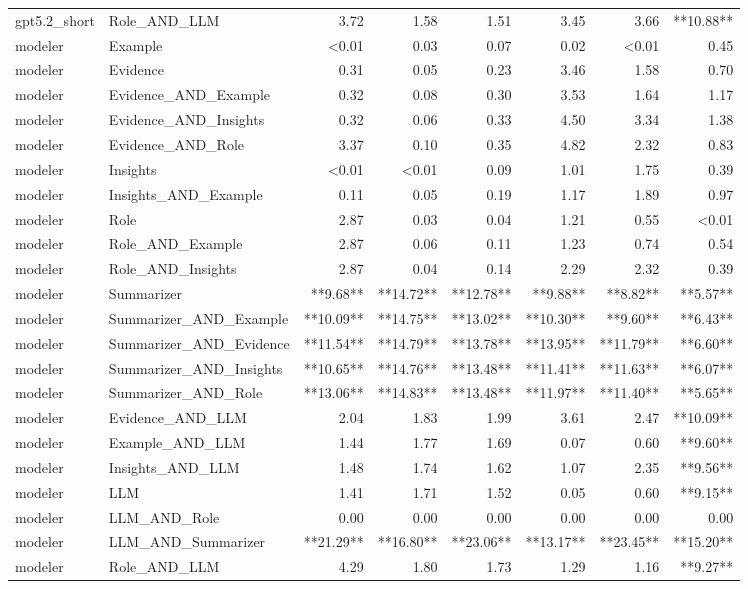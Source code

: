 \begin{tabular}{llrrrrrr}
gpt5.2_short & Role_AND_LLM & 3.72 & 1.58 & 1.51 & 3.45 & 3.66 & **10.88** \\
modeler & Example & <0.01 & 0.03 & 0.07 & 0.02 & <0.01 & 0.45 \\
modeler & Evidence & 0.31 & 0.05 & 0.23 & 3.46 & 1.58 & 0.70 \\
modeler & Evidence_AND_Example & 0.32 & 0.08 & 0.30 & 3.53 & 1.64 & 1.17 \\
modeler & Evidence_AND_Insights & 0.32 & 0.06 & 0.33 & 4.50 & 3.34 & 1.38 \\
modeler & Evidence_AND_Role & 3.37 & 0.10 & 0.35 & 4.82 & 2.32 & 0.83 \\
modeler & Insights & <0.01 & <0.01 & 0.09 & 1.01 & 1.75 & 0.39 \\
modeler & Insights_AND_Example & 0.11 & 0.05 & 0.19 & 1.17 & 1.89 & 0.97 \\
modeler & Role & 2.87 & 0.03 & 0.04 & 1.21 & 0.55 & <0.01 \\
modeler & Role_AND_Example & 2.87 & 0.06 & 0.11 & 1.23 & 0.74 & 0.54 \\
modeler & Role_AND_Insights & 2.87 & 0.04 & 0.14 & 2.29 & 2.32 & 0.39 \\
modeler & Summarizer & **9.68** & **14.72** & **12.78** & **9.88** & **8.82** & **5.57** \\
modeler & Summarizer_AND_Example & **10.09** & **14.75** & **13.02** & **10.30** & **9.60** & **6.43** \\
modeler & Summarizer_AND_Evidence & **11.54** & **14.79** & **13.78** & **13.95** & **11.79** & **6.60** \\
modeler & Summarizer_AND_Insights & **10.65** & **14.76** & **13.48** & **11.41** & **11.63** & **6.07** \\
modeler & Summarizer_AND_Role & **13.06** & **14.83** & **13.48** & **11.97** & **11.40** & **5.65** \\
modeler & Evidence_AND_LLM & 2.04 & 1.83 & 1.99 & 3.61 & 2.47 & **10.09** \\
modeler & Example_AND_LLM & 1.44 & 1.77 & 1.69 & 0.07 & 0.60 & **9.60** \\
modeler & Insights_AND_LLM & 1.48 & 1.74 & 1.62 & 1.07 & 2.35 & **9.56** \\
modeler & LLM & 1.41 & 1.71 & 1.52 & 0.05 & 0.60 & **9.15** \\
modeler & LLM_AND_Role & 0.00 & 0.00 & 0.00 & 0.00 & 0.00 & 0.00 \\
modeler & LLM_AND_Summarizer & **21.29** & **16.80** & **23.06** & **13.17** & **23.45** & **15.20** \\
modeler & Role_AND_LLM & 4.29 & 1.80 & 1.73 & 1.29 & 1.16 & **9.27** \\
\bottomrule
\end{tabular}
